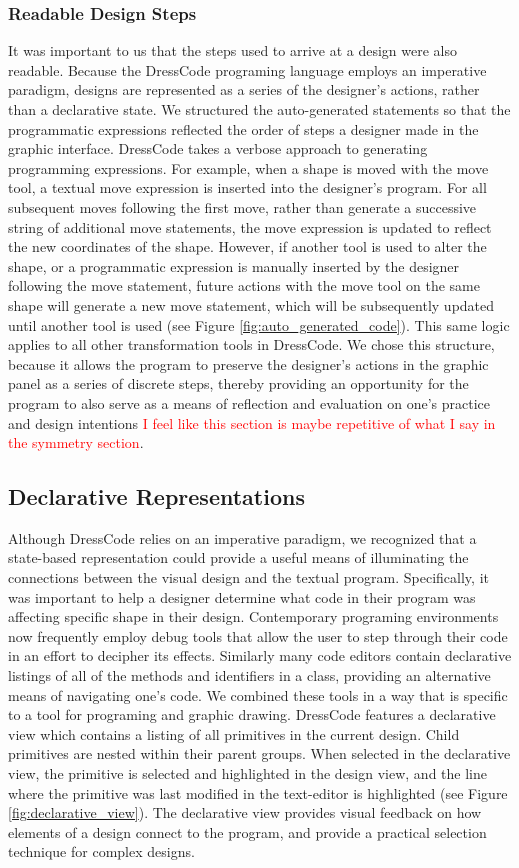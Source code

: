 \documentclass{sigchi}
\begin{document}
\subsubsection{Readable Design Steps}
 It was important to us that the steps used to arrive at a design were also readable. Because the DressCode programing language employs an imperative paradigm, designs are represented as a series of the designer's actions, rather than a declarative state. We structured the auto-generated statements so that the programmatic expressions reflected the order of steps a designer made in the graphic interface. DressCode takes a verbose approach to generating programming expressions. For example, when a shape is moved with the move tool, a textual move expression is inserted into the designer's program. For all subsequent moves following the first move, rather than generate a successive string of additional move statements, the move expression is updated to reflect the new coordinates of the shape. However, if another tool is used to alter the shape, or a programmatic expression is manually inserted by the designer following the move statement, future actions with the move tool on the same shape will generate a new move statement, which will be subsequently updated until another tool is used (see Figure \ref{fig:auto_generated_code}). This same logic applies to all other transformation tools in DressCode. We chose this structure, because it allows the program to preserve the designer's actions in the graphic panel as a series of discrete steps, thereby providing an opportunity for the program to also serve as a means of reflection and evaluation on one's practice and design intentions \textcolor{red}{I feel like this section is maybe repetitive of what I say in the symmetry section}. 

\subsection{Declarative Representations}
Although DressCode relies on an imperative paradigm, we recognized that a state-based representation could provide a useful means of illuminating the connections between the visual design and the textual program. Specifically, it was important to help a designer determine what code in their program was affecting specific shape in their design. Contemporary programing environments now frequently employ debug tools that allow the user to step through their code in an effort to decipher its effects. Similarly many code editors contain declarative listings of all of the methods and identifiers in a class, providing an alternative means of navigating one's code. We combined these tools in a way that is specific to a tool for programing and graphic drawing. DressCode features a declarative view which contains a listing of all primitives in the current design. Child primitives are nested within their parent groups. When selected in the declarative view, the primitive is selected and highlighted in the design view, and the line where the primitive was last modified in the text-editor is highlighted (see Figure \ref{fig:declarative_view}). The declarative view provides visual feedback on how elements of a design connect to the program, and provide a practical selection technique for complex designs.
\end{document}
